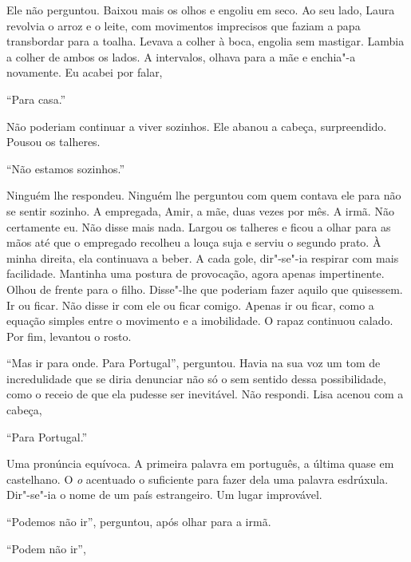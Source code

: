 Ele não perguntou. Baixou mais os olhos e engoliu em seco. Ao seu lado,
Laura revolvia o arroz e o leite, com movimentos imprecisos que faziam a
papa transbordar para a toalha. Levava a colher à boca, engolia sem
mastigar. Lambia a colher de ambos os lados. A intervalos, olhava para a
mãe e enchia"-a novamente. Eu acabei por falar,

``Para casa.''

Não poderiam continuar a viver sozinhos. Ele abanou a cabeça,
surpreendido. Pousou os talheres.

``Não estamos sozinhos.''

Ninguém lhe respondeu. Ninguém lhe perguntou com quem contava ele para
não se sentir sozinho. A empregada, Amir, a mãe, duas vezes por mês. A
irmã. Não certamente eu. Não disse mais nada. Largou os talheres e ficou
a olhar para as mãos até que o empregado recolheu a louça suja e serviu
o segundo prato. À minha direita, ela continuava a beber. A cada gole,
dir"-se"-ia respirar com mais facilidade. Mantinha uma postura de
provocação, agora apenas impertinente. Olhou de frente para o filho.
Disse"-lhe que poderiam fazer aquilo que quisessem. Ir ou ficar. Não
disse ir com ele ou ficar comigo. Apenas ir ou ficar, como a equação
simples entre o movimento e a imobilidade. O rapaz continuou calado. Por
fim, levantou o rosto.

``Mas ir para onde. Para Portugal'',
perguntou. Havia na sua voz um tom de incredulidade que se diria
denunciar não só o sem sentido dessa possibilidade, como o receio de que
ela pudesse ser inevitável. Não respondi. Lisa acenou com a cabeça,

``Para Portugal.''

Uma pronúncia equívoca. A primeira palavra em português, a última quase
em castelhano. O \emph{o} acentuado o suficiente para fazer dela uma
palavra esdrúxula. Dir"-se"-ia o nome de um país estrangeiro. Um lugar
improvável.

``Podemos não ir'',
perguntou, após olhar para a irmã.

``Podem não ir'',

